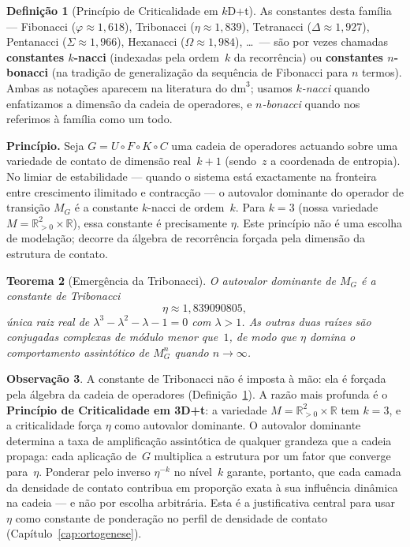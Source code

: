 \documentclass[12pt,a4paper,twoside]{book}
\theoremstyle{plain}
\newtheorem{teorema}{Teorema}[section]
\theoremstyle{definition}
\theoremstyle{definition}
\newtheorem{definicao}[teorema]{Definição}
\newtheorem{observacao}[teorema]{Observação}
\newcommand{\R}{\mathbb{R}}
\newcommand{\tribo}{\eta}
\newcommand{\dm}{\mathrm{dm}^{3}}
\begin{document}
\begin{definicao}[Princípio de Criticalidade em $k$D+t]\label{def:criticalidade}
As constantes desta família ---
Fibonacci ($\varphi \approx 1{,}618$), Tribonacci ($\eta \approx 1{,}839$),
Tetranacci ($\Delta \approx 1{,}927$), Pentanacci ($\Sigma \approx 1{,}966$),
Hexanacci ($\Omega \approx 1{,}984$), \ldots\ ---
são por vezes chamadas \textbf{constantes $k$-nacci}
(indexadas pela ordem~$k$ da recorrência) ou
\textbf{constantes $n$-bonacci}
(na tradição de generalização da sequência de Fibonacci para $n$ termos).
Ambas as notações aparecem na literatura do $\dm$; usamos \emph{$k$-nacci}
quando enfatizamos a dimensão da cadeia de operadores,
e \emph{$n$-bonacci} quando nos referimos à família como um todo.

\medskip
\textbf{Princípio.} Seja $G = U \circ F \circ K \circ C$ uma cadeia de
operadores actuando sobre uma variedade de contato de dimensão real~$k+1$
(sendo~$z$ a coordenada de entropia). No limiar de estabilidade --- quando o
sistema está exactamente na fronteira entre crescimento ilimitado e contracção
--- o autovalor dominante do operador de transição $M_{G}$ é a constante
$k$-nacci de ordem~$k$. Para $k = 3$ (nossa variedade $M = \R^{2}_{>0} \times \R$),
essa constante é precisamente $\eta$. Este princípio não é uma escolha de
modelação; decorre da álgebra de recorrência forçada pela dimensão da
estrutura de contato.
\end{definicao}

\begin{teorema}[Emergência da Tribonacci]\label{thm:tribo-emerge}
O autovalor dominante de $M_{G}$ é a constante de Tribonacci
\[
  \tribo \approx 1{,}839090805,
\]
única raiz real de $\lambda^{3} - \lambda^{2} - \lambda - 1 = 0$ com
$\lambda > 1$. As outras duas raízes são conjugadas complexas de módulo
menor que~$1$, de modo que $\tribo$ domina o comportamento assintótico
de $M_{G}^{n}$ quando $n \to \infty$.
\end{teorema}

\begin{observacao}
A constante de Tribonacci não é imposta à mão: ela é forçada pela álgebra
da cadeia de operadores (Definição~\ref{def:criticalidade}).
A razão mais profunda é o \textbf{Princípio de Criticalidade em 3D+t}:
a variedade $M = \R^{2}_{>0} \times \R$ tem $k = 3$, e a criticalidade
força $\eta$ como autovalor dominante. O autovalor dominante determina a taxa
de amplificação assintótica de qualquer grandeza que a cadeia propaga: cada
aplicação de~$G$ multiplica a estrutura por um fator que converge para~$\eta$.
Ponderar pelo inverso $\eta^{-k}$ no nível~$k$ garante, portanto, que cada
camada da densidade de contato contribua em proporção exata à sua influência
dinâmica na cadeia --- e não por escolha arbitrária. Esta é a justificativa
central para usar $\tribo$ como constante de ponderação no perfil de densidade
de contato (Capítulo~\ref{cap:ortogenese}).
\end{observacao}
\end{document}
